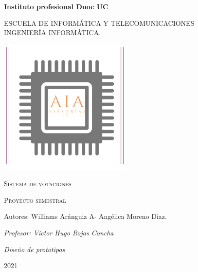 \begin{titlepage}
\centering
{\vspace{1cm}
{\bfseries\LARGE Instituto profesional Duoc UC \par}
\vspace{0.7cm}
{\scshape\Large ESCUELA DE
INFORMÁTICA Y TELECOMUNICACIONES\\
INGENIERÍA INFORMÁTICA.\par}
\vspace{1.5cm}
\includegraphics[width=0.5\textwidth]{Figuras/Logo-AIA.jpeg}\par}

{\scshape\LARGE Sistema de votaciones \par}
{\scshape\large Proyecto semestral \par}
\vspace{3cm}
{\normalsize Autores: Williams Aránguiz A- Angélica Moreno Diaz.\par
}

\vspace{0.5cm}
\raggedleft
{\itshape\normalsize Profesor: Víctor Hugo Rojas Concha\par}
{\itshape\normalsize Diseño de prototipos \par}

\centering
\vfill
{\Large 2021 \par}
\end{titlepage}